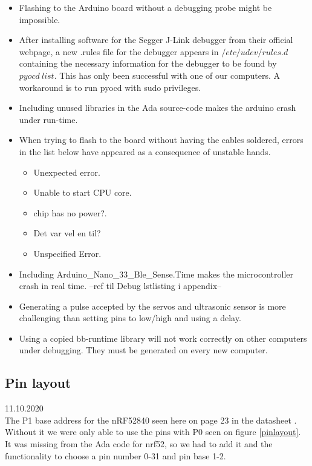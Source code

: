 \documentclass{article}
\begin{document}
\begin{itemize}
	\item Flashing to the Arduino board without a debugging probe might be impossible.

	\item After installing software for the Segger J-Link debugger from their official webpage, a new .rules file for the debugger appears in $/etc/udev/rules.d$ containing the necessary information for the debugger to be found by $pyocd\ list$. This has only been successful with one of our computers. A workaround is to run pyocd with sudo privileges.

	\item Including unused libraries in the Ada source-code makes the arduino crash under run-time.

	\item When trying to flash to the board without having the cables soldered, errors in the list below have appeared as a consequence of unstable hands.
		\begin{itemize}
			\item Unexpected error.
			\item Unable to start CPU core.
			\item chip has no power?.
			\item Det var vel en til?
            \item Unspecified Error.
		\end{itemize}

	\item Including Arduino\_Nano\_33\_Ble\_Sense.Time makes the microcontroller crash in real time. --ref til Debug lstlisting i appendix--

	\item Generating a pulse accepted by the servos and ultrasonic sensor is more challenging than setting pins to low/high and using a delay.

	\item Using a copied bb-runtime library will not work correctly on other computers under debugging. They must be generated on every new computer.

\end{itemize}

\subsection{Pin layout}
11.10.2020\\
The P1 base address for the nRF52840 seen here on page 23 in the datasheet \cite{NRF52840}. Without it we were only able to use the pins with P0 seen on figure \ref{pinlayout}. It was missing from the Ada code for nrf52, so we had to add it and the functionality to choose a pin number 0-31 and pin base 1-2.
\end{document}
